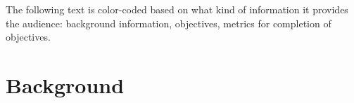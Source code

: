 \documentclass{beamer}
\newcommand{\tbackground}[1]{#1}
\newcommand{\tobjectives}[1]{#1}
\newcommand{\tmetrics}[1]{#1}
\newcommand{\tbackground}[1]{\textcolor{tbackground}{#1}}
\newcommand{\tobjectives}[1]{\textcolor{tobjectives}{#1}}
\newcommand{\tmetrics}[1]{\textcolor{tmetrics}{#1}}
\begin{document}


\frame{\titlepage}

\ifx \tcolor \undefined
\else
	The following text is color-coded based on what kind of
	information it provides the audience:
	\tbackground{background information},
	\tobjectives{objectives},
	\tmetrics{metrics for completion of objectives}.
\fi

\ifx \printpresentarticle \undefined \else
	\tableofcontents
\fi

\section{Background}
\end{document}
